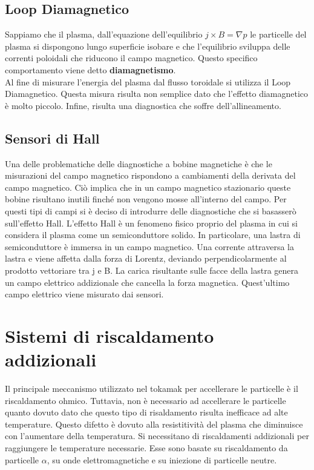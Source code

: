 \documentclass{article}
\begin{document}
\subsection{Loop Diamagnetico}
Sappiamo che il plasma, dall'equazione dell'equilibrio \(j\times B=\nabla p\) le particelle del plasma si dispongono lungo superficie isobare e che l'equilibrio sviluppa delle correnti poloidali che riducono il campo magnetico. Questo specifico comportamento viene detto \textbf{diamagnetismo}.\\
Al fine di misurare l'energia del plasma dal flusso toroidale si utilizza il Loop Diamagnetico. Questa misura risulta non semplice dato che l'effetto diamagnetico è molto piccolo.\newline
Infine, risulta una diagnostica che soffre dell'allineamento.
\subsection{Sensori di Hall}
Una delle problematiche delle diagnostiche a bobine magnetiche è che le misurazioni del campo magnetico rispondono a cambiamenti della derivata del campo magnetico. Ciò implica che in un campo magnetico stazionario queste bobine risultano inutili finché non vengono mosse all'interno del campo.\newline
Per questi tipi di campi si è deciso di introdurre delle diagnostiche che si basasserò sull'effetto Hall.\newline
L'effetto Hall è un fenomeno fisico proprio del plasma in cui si considera il plasma come un semiconduttore solido. In particolare, una lastra di semiconduttore è immersa in un campo magnetico. Una corrente attraversa la lastra e viene affetta dalla forza di Lorentz, deviando perpendicolarmente al prodotto vettoriare tra j e B.\newline
La carica risultante sulle facce della lastra genera un campo elettrico addizionale che cancella la forza magnetica. Quest'ultimo campo elettrico viene misurato dai sensori.
\section{Sistemi di riscaldamento addizionali}
Il principale meccanismo utilizzato nel tokamak per accellerare le particelle è il riscaldamento ohmico. Tuttavia, non è necessario ad accellerare le particelle quanto dovuto dato che questo tipo di risaldamento risulta inefficace ad alte temperature. Questo difetto è dovuto alla resistitività del plasma che diminuisce con l'aumentare della temperatura.\newline
Si necessitano di riscaldamenti addizionali per raggiungere le temperature necessarie. Esse sono basate su riscaldamento da particelle \(\alpha\), su onde elettromagnetiche e su iniezione di particelle neutre.
\end{document}
